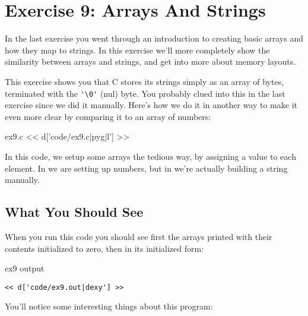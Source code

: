 \chapter{Exercise 9: Arrays And Strings}

In the last exercise you went through an introduction to creating basic
arrays and how they map to strings.  In this exercise we'll more completely
show the similarity between arrays and strings, and get into more about
memory layouts.

This exercise shows you that C stores its strings simply as an array
of bytes, terminated with the \verb|'\0'| (nul) byte.  You probably clued
into this in the last exercise since we did it manually.  Here's
how we do it in another way to make it even more clear by comparing it
to an array of numbers:

\begin{code}{ex9.c}
<< d['code/ex9.c|pyg|l'] >>
\end{code}

In this code, we setup some arrays the tedious way, by assigning a value
to each element.  In  we are setting up numbers, but in
 we're actually building a string manually.

\section{What You Should See}

When you run this code you should see first the arrays printed with
their contents initialized to zero, then in its initialized form:

\begin{code}{ex9 output}
\begin{lstlisting}
<< d['code/ex9.out|dexy'] >>
\end{lstlisting}
\end{code}

You'll notice some interesting things about this program:

